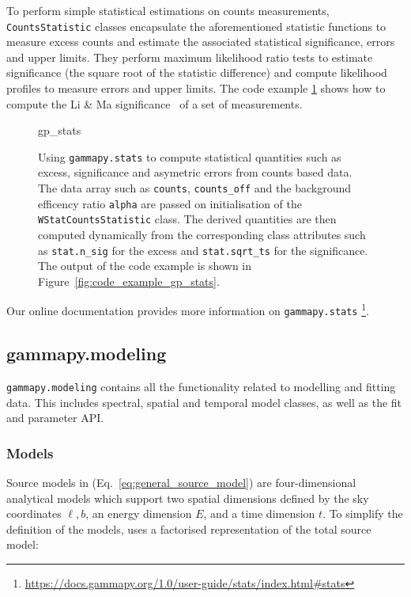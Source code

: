 \documentclass[longauth]{aa}
\newcommand{\code}[1]{\texttt{#1}}
\begin{document}
To perform simple statistical estimations on counts measurements,
\code{CountsStatistic} classes encapsulate the aforementioned statistic functions to
measure excess counts and estimate the associated statistical significance,
errors and upper limits. They perform maximum likelihood ratio tests to
estimate significance (the square root of the statistic difference) and compute
likelihood profiles to measure errors and upper limits. The code example
\ref{fig*:minted:gp_stats} shows how to compute the Li \& Ma
significance~\citep{LiMa} of a set of measurements.

\begin{figure}
	\small
	{gp_stats}
	\caption{
        Using \code{gammapy.stats} to compute statistical quantities
        such as excess, significance and asymetric errors
        from counts based data. The data array such as \code{counts}, \code{counts\_off}
		and the background efficency ratio \code{alpha} are passed on initialisation
        of the \code{WStatCountsStatistic} class. The derived quantities
        are then computed dynamically from the corresponding class
        attributes such as \code{stat.n\_sig} for the excess
		and \code{stat.sqrt\_ts} for the significance.
		The output of the code example is shown in Figure~\ref{fig:code_example_gp_stats}.
    }
	\label{fig*:minted:gp_stats}
\end{figure}

Our online documentation provides more information on \code{gammapy.stats}
\footnote{\url{https://docs.gammapy.org/1.0/user-guide/stats/index.html\#stats}}. 


\subsection{gammapy.modeling}
\label{ssec:gammapy-modeling}
%
\code{gammapy.modeling} contains all the functionality related to modelling and fitting
data. This includes spectral, spatial and temporal model classes, as well as
the fit and parameter API.

\subsubsection{Models}
\label{sssec:models}
Source models in \gammapy (Eq.~\ref{eq:general_source_model}) are four-dimensional 
analytical models which support two spatial dimensions defined by the sky coordinates
$\ell, b$, an energy dimension $E$, and a time dimension $t$. To simplify the definition of the
models, \gammapy uses a factorised representation of the total source
model:
\end{document}
